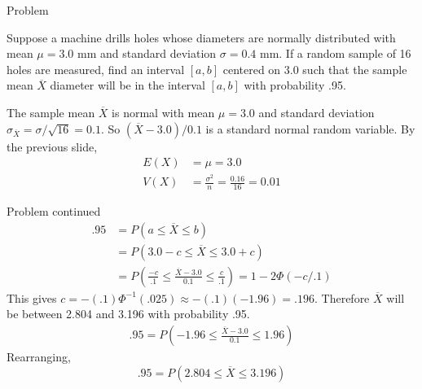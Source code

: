 \documentclass[t,handout]{beamer}
\begin{document}
    \begin{frame}{Problem}
    \begin{block}{}
    Suppose a machine drills holes whose diameters are normally distributed with mean $\mu=3.0 $ mm and standard deviation $\sigma=0.4$ mm. If a random sample of 16 holes are measured, find an interval $[a,b]$ centered on 3.0 such that the sample mean $\overline{X}$ diameter will be in the interval $[a,b]$ with probability .95.
    \end{block}
    \pause The sample mean $\overline{X}$ is normal with mean $\mu=3.0$ and standard deviation $\sigma_{\overline X} = \sigma/\sqrt{16} = 0.1$. So $(\overline X-3.0)/0.1$ is a standard normal random variable. 
    \pause By the previous slide,
    \begin{align*}
    E(X) &= \mu=3.0 \\
    V(X) &= \frac{\sigma^2}n = \frac{0.16}{16} = 0.01
    \end{align*}
\end{frame}
    \begin{frame}{Problem continued}
    \begin{align*}
    .95 &= P(a \leq \overline{X} \leq b) \\
    &= P(3.0-c \leq \overline{X} \leq 3.0+c) \\
    &= P\left(\frac{-c}{.1} \leq \frac{\overline{X}-3.0}{0.1} \leq \frac{c}{.1}\right)
    = 1-2\Phi(-c/.1)
    \end{align*}
    This gives $c=-(.1)\Phi^{-1}(.025)\approx -(.1)(-1.96) = .196$. Therefore $\overline X$ will be between 2.804 and 3.196 with probability .95.
    \begin{align*}
    .95 = P(-1.96 \leq \frac{\overline X-3.0}{0.1} \leq 1.96)
    \end{align*}
    \pause Rearranging,
    $$.95 = P(2.804 \leq \overline{X} \leq 3.196)$$
    \end{frame}
    
\end{document}

